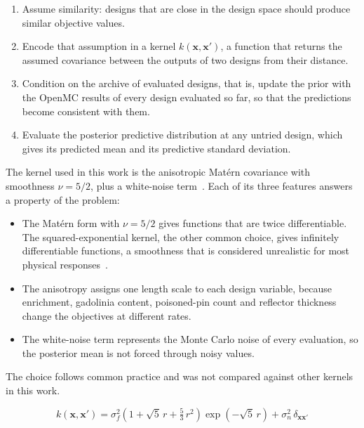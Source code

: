 \begin{enumerate}
  \item Assume similarity: designs that are close in the design space
        should produce similar objective values.

  \item Encode that assumption in a kernel $k(\mathbf{x},\mathbf{x}')$,
        a function that returns the assumed covariance between the
        outputs of two designs from their distance.

  \item Condition on the archive of evaluated designs, that is, update
        the prior with the OpenMC results of every design evaluated so
        far, so that the predictions become consistent with them.

  \item Evaluate the posterior predictive distribution at any untried
        design, which gives its predicted mean and its predictive
        standard deviation.
\end{enumerate}

The kernel used in this work is the anisotropic Mat\'ern covariance
with smoothness $\nu = 5/2$, plus a white-noise
term~\cite{rasmussen_gp_2006}. Each of its three features answers a
property of the problem:

\begin{itemize}
  \item The Mat\'ern form with $\nu = 5/2$ gives functions that are twice
        differentiable. The squared-exponential kernel, the other common
        choice, gives infinitely differentiable functions, a smoothness
        that is considered unrealistic for most physical
        responses~\cite{rasmussen_gp_2006}.

  \item The anisotropy assigns one length scale to each design variable,
        because enrichment, gadolinia content, poisoned-pin count and
        reflector thickness change the objectives at different rates.

  \item The white-noise term represents the Monte Carlo noise of every
        evaluation, so the posterior mean is not forced through noisy
        values.
\end{itemize}

The choice follows common practice and was not compared against other
kernels in this work.

\begin{equation}
k(\mathbf{x}, \mathbf{x}')
= \sigma_f^{2}
\left( 1 + \sqrt{5}\,r + \tfrac{5}{3}\,r^{2} \right)
\exp\!\left( -\sqrt{5}\,r \right)
+ \sigma_n^{2}\,\delta_{\mathbf{x}\mathbf{x}'}
\label{eq:kernel}
\end{equation}

